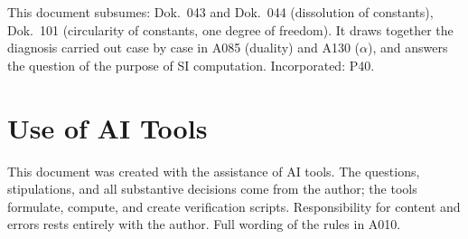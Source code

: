 This document subsumes: Dok.~043 and Dok.~044 (dissolution of constants), Dok.~101
(circularity of constants, one degree of freedom). It draws together the diagnosis
carried out case by case in A085 (duality) and A130 ($\alpha$), and answers the
question of the purpose of SI computation. Incorporated: P40.

\section{Use of AI Tools}

This document was created with the assistance of AI tools. The questions,
stipulations, and all substantive decisions come from the author; the tools
formulate, compute, and create verification scripts.
Responsibility for content and errors rests entirely with the author.
Full wording of the rules in A010.
